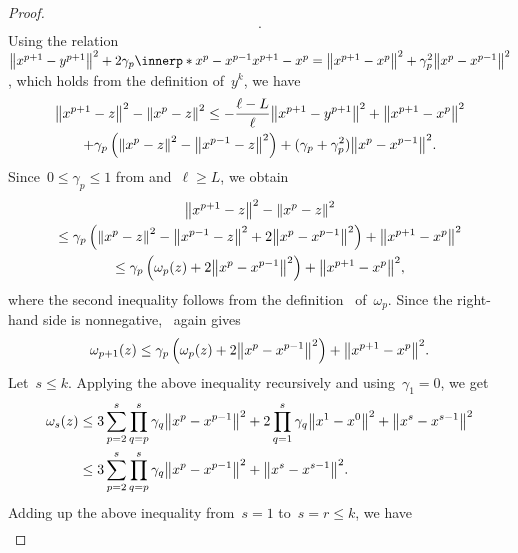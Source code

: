 \documentclass[../main]{subfiles}
\begin{document}
\begin{proof}
\begin{multline}
    .\end{multline}
    Using the relation~$\norm*{x^{p + 1} - y^{p + 1}}^2 + 2 \gamma_p \innerp*{x^p - x^{p - 1}}{x^{p + 1} - x^p} = \norm*{x^{p + 1} - x^p}^2 + \gamma_p^2 \norm*{x^p - x^{p - 1}}^2$, which holds from the definition of~$y^k$, we have
    \begin{multline}
        \norm*{x^{p + 1} - z}^2 - \norm*{x^p - z}^2
        \le - \frac{\ell - L}{\ell} \norm*{x^{p + 1} - y^{p + 1}}^2 + \norm*{x^{p + 1} - x^p}^2 \\
        + \gamma_p \left( \norm*{x^p - z}^2 - \norm*{x^{p - 1} - z}^2 \right) + ( \gamma_p + \gamma_p^2 ) \norm*{x^p - x^{p - 1}}^2
    .\end{multline}
    Since~$0 \le \gamma_p \le 1$ from  and~$\ell \ge L$, we obtain
    \begin{multline}
        \norm*{x^{p + 1} - z}^2 - \norm*{x^p - z}^2 \\
        \le \gamma_p \left( \norm*{x^p - z}^2 - \norm*{x^{p - 1} - z}^2 + 2 \norm*{x^p - x^{p - 1}}^2 \right) + \norm*{x^{p + 1} - x^p}^2 \\
        \le \gamma_p \left( \omega_p(z) + 2 \norm*{x^p - x^{p - 1}}^2 \right) + \norm*{x^{p + 1} - x^p}^2
    ,\end{multline}
    where the second inequality follows from the definition~ of~$\omega_p$.
    Since the right-hand side is nonnegative,~ again gives
    \begin{equation}
        \omega_{p + 1}(z) \le \gamma_p \left( \omega_p(z) + 2 \norm*{x^p - x^{p - 1}}^2 \right) + \norm*{x^{p + 1} - x^p}^2 
    .\end{equation}
    Let~$s \le k$.
    Applying the above inequality recursively and using~$\gamma_1 = 0$, we get
    \begin{equation}
        \begin{split}
            \omega_s(z) &\le 3 \sum_{p = 2}^{s} \prod_{q = p}^{s} \gamma_q \norm*{x^p - x^{p - 1}}^2 + 2 \prod_{q = 1}^{s} \gamma_q \norm*{x^1 - x^0}^2 + \norm*{x^s - x^{s - 1}}^2 \\
                        &\le 3 \sum_{p = 2}^{s} \prod_{q = p}^{s} \gamma_q \norm*{x^p - x^{p - 1}}^2 + \norm*{x^s - x^{s - 1}}^2
        .\end{split}
    \end{equation}
    Adding up the above inequality from~$s = 1$ to~$s = r \le k$, we have
    \begin{equation}
        \begin{split}

\end{split}
\end{equation}
\end{proof}
\end{document}

